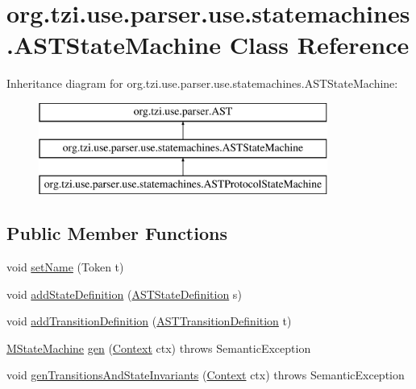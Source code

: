 \hypertarget{classorg_1_1tzi_1_1use_1_1parser_1_1use_1_1statemachines_1_1_a_s_t_state_machine}{\section{org.\-tzi.\-use.\-parser.\-use.\-statemachines.\-A\-S\-T\-State\-Machine Class Reference}
\label{classorg_1_1tzi_1_1use_1_1parser_1_1use_1_1statemachines_1_1_a_s_t_state_machine}
}
Inheritance diagram for org.\-tzi.\-use.\-parser.\-use.\-statemachines.\-A\-S\-T\-State\-Machine\-:\begin{figure}[H]
\begin{center}
\leavevmode
\includegraphics[height=3.000000cm]{classorg_1_1tzi_1_1use_1_1parser_1_1use_1_1statemachines_1_1_a_s_t_state_machine}
\end{center}
\end{figure}
\subsection*{Public Member Functions}
\begin{DoxyCompactItemize}
\item 
void \hyperlink{classorg_1_1tzi_1_1use_1_1parser_1_1use_1_1statemachines_1_1_a_s_t_state_machine_a74f234396fcdb10a1aba58b06a38b33e}{set\-Name} (Token t)
\item 
void \hyperlink{classorg_1_1tzi_1_1use_1_1parser_1_1use_1_1statemachines_1_1_a_s_t_state_machine_a3eb5f210c0e9bb188d782d557e99fde1}{add\-State\-Definition} (\hyperlink{classorg_1_1tzi_1_1use_1_1parser_1_1use_1_1statemachines_1_1_a_s_t_state_definition}{A\-S\-T\-State\-Definition} s)
\item 
void \hyperlink{classorg_1_1tzi_1_1use_1_1parser_1_1use_1_1statemachines_1_1_a_s_t_state_machine_aee88b27e9afe02d0c923a1ad1b781ad0}{add\-Transition\-Definition} (\hyperlink{classorg_1_1tzi_1_1use_1_1parser_1_1use_1_1statemachines_1_1_a_s_t_transition_definition}{A\-S\-T\-Transition\-Definition} t)
\item 
\hyperlink{classorg_1_1tzi_1_1use_1_1uml_1_1mm_1_1statemachines_1_1_m_state_machine}{M\-State\-Machine} \hyperlink{classorg_1_1tzi_1_1use_1_1parser_1_1use_1_1statemachines_1_1_a_s_t_state_machine_a9a81e6d525c322543ee2461f3fc19ce3}{gen} (\hyperlink{classorg_1_1tzi_1_1use_1_1parser_1_1_context}{Context} ctx)  throws Semantic\-Exception 
\item 
void \hyperlink{classorg_1_1tzi_1_1use_1_1parser_1_1use_1_1statemachines_1_1_a_s_t_state_machine_a596ecbfc5d5b30b0bcea580180331958}{gen\-Transitions\-And\-State\-Invariants} (\hyperlink{classorg_1_1tzi_1_1use_1_1parser_1_1_context}{Context} ctx)  throws Semantic\-Exception 
\end{DoxyCompactItemize}
